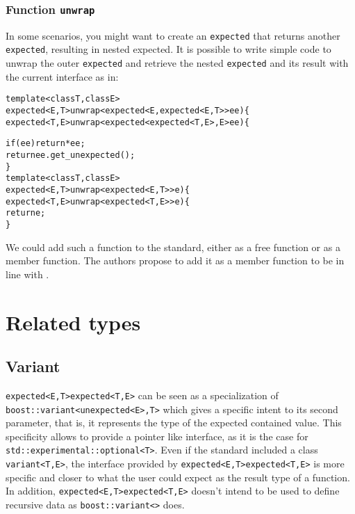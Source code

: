 \documentclass[a4paper,10pt]{article}
\newcommand{\cpp}[1]{\lstinline{#1}}
\newcommand{\suppress}[1]{\colorbox{suppress_color}{#1}}
\newcommand{\update}[1]{\colorbox{update_color}{#1}}
\begin{document}
\subsubsection{Function \cpp{unwrap}}

In some scenarios, you might want to create an \cpp{expected} that returns another \cpp{expected}, resulting in nested expected. It is possible to write simple code to unwrap the outer \cpp{expected} and retrieve the nested \cpp{expected} and its result with the current interface as in:

\begin{alltt}
template <class T, class E>
\suppress{expected<E,T> unwrap<expected<E, expected<E,T>> ee) \{}
\update{expected<T,E> unwrap<expected<expected<T,E>,E> ee) \{}

  if (ee) return *ee;
  return ee.get_unexpected();
\}
template <class T, class E>
\suppress{expected<E,T> unwrap<expected<E,T>> e) \{ }
\update{expected<T,E> unwrap<expected<T,E>> e) \{ }
  return e;
\}
\end{alltt}

We could add such a function to the standard, either as a free function or as a member function. The authors propose to add it as a member function to be in line with \cite{ImprovementsAsync}.

\section{Related types}

\subsection{Variant}

\suppress{\cpp{expected<E,T>}}\update{\cpp{expected<T,E>}} can be seen as a specialization of  \cpp{boost::variant<unexpected<E>,T>} which gives a specific intent to its second parameter, that is, it represents the type of the expected contained value. This specificity allows to provide a pointer like interface, as it is the case for \cpp{std::experimental::optional<T>}. Even if the standard included a class  \cpp{variant<T,E>}, the interface provided by \suppress{\cpp{expected<E,T>}}\update{\cpp{expected<T,E>}} is more specific and closer to what the user could expect as the result type of a function. In addition, \suppress{\cpp{expected<E,T>}}\update{\cpp{expected<T,E>}} doesn't intend to be used to define recursive data as \cpp{boost::variant<>} does.
\end{document}
